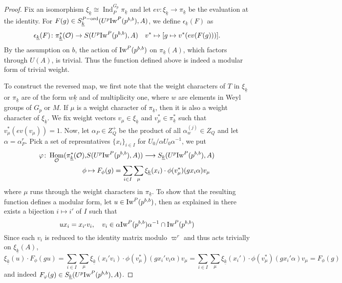 \documentclass[leqno]{amsart}
\newcommand{\wt}[1]{\underline{ #1 }}
\newcommand{\Iw}{\textnormal{Iw}}
\newcommand{\ord}{\textnormal{ord}}
\newcommand{\oo}{\mathcal{O}} %
\DeclareMathOperator{\Hom}{Hom}
\DeclareMathOperator{\Ind}{Ind}
\theoremstyle{definition}
\theoremstyle{remark}
\begin{document}
\begin{proof}
	Fix an isomorphism $\xi_{\wt{k}}\cong \Ind_{P}^{G_p}\pi_{\wt{k}}$
	and let $ev\colon \xi_{\wt{k}}\to \pi_{\wt{k}}$
	be the evaluation at the identity.
	For $F(g)\in S_{\wt{k}}^{P-\ord}(U^p\Iw^P(p^{b,b}),A)$, we define 
	$\epsilon_{\wt{k}}(F)$ as 
	\begin{equation}\label{eq:wt_indep}
	\epsilon_{\wt{k}}(F)\colon \pi^*_{\wt{k}}(\oo)\rightarrow
	S(U^p\Iw^P(p^{b,b}),A)\quad
	v^*\mapsto [g\mapsto v^*(ev(F(g)))].
	\end{equation}
	By the assumption on $b$,
	the action of $\Iw^P(p^{b,b})$ on $\pi_{\wt{k}}(A)$,
	which factors through $U(A)$,
	is trivial.
	Thus the function defined above is indeed a modular form
	of trivial weight.


	To construct the reversed map,
	we first note that the weight characters of $T$
	in $\xi_{\wt{k}}$ or $\pi_{\wt{k}}$
	are of the form $w\wt{k}$
	and of multiplicity one,
	where $w$ are elements in Weyl groups of $G_p$ or $M$.
	If $\mu$ is a weight character of  $\pi_{\wt{k}}$, then
	it is also a weight character  of $\xi_{\wt{k}}$.
	We fix weight vectors $v_\mu\in \xi_{\wt{k}}$
	and $v^*_\mu\in \pi_{\wt{k}}^*$
	such that $v^*_{\mu}(ev(v_\mu))=1$.
	Now, let $\alpha_P\in Z_Q^+$ be the product
	of all $\alpha_w^{(j)}\in Z_Q$ and 
	let $\alpha=\alpha_P^r$.
	Pick a set of represntatives $\{x_i\}_{i\in I}$
	for $U_0/\alpha U_0\alpha^{-1}$,
	we put 
	\begin{align*}
		\varphi\colon 
		\Hom_{\oo}(\pi_{\wt{k}}^*(\oo),&
		S(U^p\Iw^P(p^{b,b}),A))\longrightarrow
		S_{\wt{k}}(U^p\Iw^P(p^{b,b}),A)\\
		\phi&\mapsto 
		F_\phi(g)=\sum_{i\in I} \sum_{\mu}
		\xi_{\wt{k}}(x_i)\cdot \phi(v^*_\mu)(gx_i\alpha)v_\mu
	\end{align*}
	where $\mu$ runs through the weight characters in  $\pi_{\wt{k}}$.
	To show that the resulting function defines a modular form,
	let $u\in \Iw^P(p^{b,b})$, then as explained in \cite[Prop 2.22]{ger}
	there exists a bijection $i\mapsto i'$ of $I$ such that 
	 \[
		ux_i=x_{i'}v_i,\quad
		v_i\in\alpha\Iw^P(p^{b,b})\alpha^{-1} \cap \Iw^P(p^{b,b})
	\]
	Since each $v_i$ is reduced to the identity matrix 
	modulo $\varpi^r$ and thus acts trivially on $\xi_{\wt{k}}(A)$,
	\[
		\xi_{\wt{k}}(u)\cdot F_\phi(gu)=
		\sum_{i\in I}\sum_{\mu}
		\xi_{\wt{k}}(x_i'v_i)\cdot 
		\phi(v^*_\mu)(gx_i'v_i\alpha)v_\mu=
		\sum_{i\in I}\sum_{\mu}
		\xi_{\wt{k}}(x_i')\cdot 
		\phi(v^*_\mu)(gx_i'\alpha)v_\mu=F_\phi(g)
	\]
	and indeed $F_\varphi(g)\in S_{\wt{k}}(U^p\Iw^P(p^{b,b}),A)$.


\end{proof}
\end{document}
